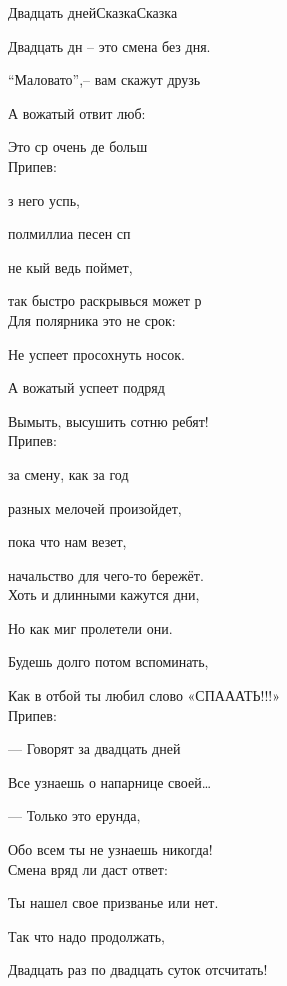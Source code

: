 \documentclass[11pt,a5paper]{book}
\renewcommand{\tt}{\indent \indent}
\begin{document}
\begin{song}{Двадцать дней}{}{Сказка}{Сказка}{}{}


Двадцать дн – это смена без дня.\par
“Маловато”,– вам скажут друзь\par
А вожатый отвит люб:\par
Это ср очень де больш\\
 

Припев:\par
{} з него успь,\par
{} полмиллиа песен сп\par
{} не кый ведь поймет,\par
{} так быстро раскрывься может р\\


Для полярника это не срок:\par
Не успеет просохнуть носок.\par
А вожатый успеет подряд \par
Вымыть, высушить сотню ребят!\\

Припев:\par
{} за смену, как за год \par
{} разных мелочей произойдет,\par
{} пока что нам везет,\par
{} начальство для чего-то бережёт.\\


\newpage
Хоть и длинными кажутся дни,\par
Но как миг пролетели они.\par
Будешь долго потом вспоминать,\par
Как в отбой ты любил слово «СПАААТЬ!!!»\\

Припев:\par
\tt          	— Говорят за двадцать дней \par
\tt          	Все узнаешь о напарнице своей…\par
\tt          	— Только это ерунда,\par
\tt          	Обо всем ты не узнаешь никогда!\\

Смена вряд ли даст ответ:\par
Ты нашел свое призванье или нет.\par
Так что надо продолжать,\par
Двадцать раз по двадцать суток отсчитать!\\


\end{song}
\end{document}
